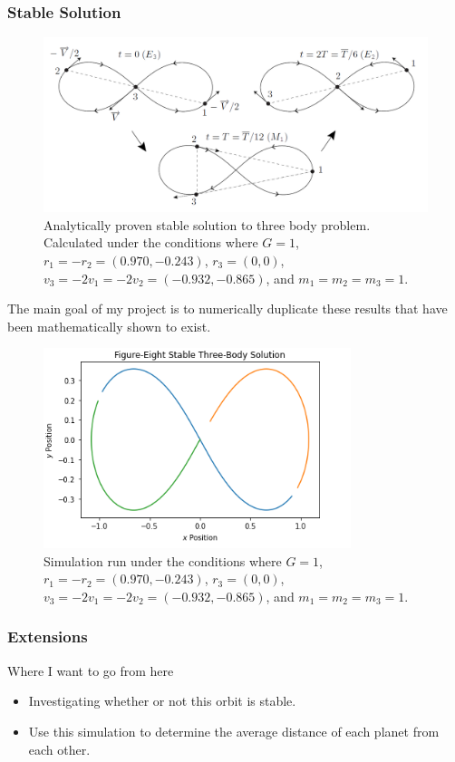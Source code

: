 \documentclass{beamer}
\renewcommand{\l}{\left}
\renewcommand{\r}{\right}
\begin{document}
\begin{frame}
\frametitle{Stable Solution}
\begin{figure}
	\centering
	\includegraphics[width = 0.7\linewidth]{Figure_Eight_Solution.png}
	\caption{Analytically proven stable solution to three body problem. Calculated under the conditions where $G = 1$, $r_1 = -r_2 = \l( 0.970 , -0.243 \r)$, $r_3 = (0,0)$, $v_3 = -2v_1 = -2v_2 = \l(-0.932, -0.865\r)$, and $m_1 = m_2 = m_3 = 1$.}
	\label{fig:Figure_Eight_Solution}
\end{figure}
The main goal of my project is to numerically duplicate these results that have been mathematically shown to exist. 
\end{frame}


\begin{frame}

\begin{figure}
	\centering
	\includegraphics[width = 0.8\textwidth]{Figure_Eight_Solution_Simulation.png}
	\caption{Simulation run under the conditions where $G = 1$, $r_1 = -r_2 = \l( 0.970 , -0.243 \r)$, $r_3 = (0,0)$, $v_3 = -2v_1 = -2v_2 = \l(-0.932, -0.865\r)$, and $m_1 = m_2 = m_3 = 1$.}
	\label{fig:Figure_Eight_Solution_Simulation}
\end{figure}
\end{frame}


\begin{frame}
	\frametitle{Extensions}
	Where I want to go from here
	\begin{itemize}
		\item Investigating whether or not this orbit is stable.
		\item Use this simulation to determine the average distance of each planet from each other.
	\end{itemize}
\end{frame}
\end{document}
